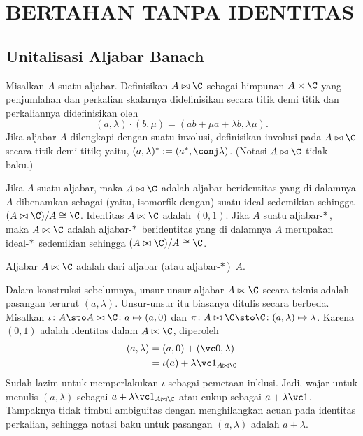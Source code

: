 \chapter{BERTAHAN TANPA IDENTITAS}

\section{Unitalisasi Aljabar Banach}
\begin{defn}\label{00150005} Misalkan $A$ suatu aljabar. Definisikan
$A \bowtie \C$ sebagai himpunan $A \times \C$ yang penjumlahan dan perkalian skalarnya
didefinisikan secara titik demi titik dan perkaliannya didefinisikan oleh
  \[ (a,\lambda)\cdot(b,\mu) = (ab + \mu a + \lambda b, \lambda\mu). \]
Jika aljabar $A$ dilengkapi dengan suatu involusi, definisikan involusi pada $A \bowtie \C$
secara titik demi titik; yaitu, $(a,\lambda)^* := (a^*, \conj\lambda)$. (Notasi $A \bowtie \C$
tidak baku.)
\end{defn}

\begin{prop}\label{0015001} Jika $A$ suatu aljabar, maka $A \bowtie \C$ adalah aljabar
beridentitas yang di dalamnya $A$ dibenamkan sebagai (yaitu, isomorfik dengan) suatu ideal
sedemikian sehingga $(A \bowtie \C)/A \cong \C$. Identitas $A \bowtie \C$ adalah $(0,1)$. Jika
$A$ suatu aljabar-$*\,$, maka $A \bowtie \C$ adalah aljabar-$*\,$ beridentitas yang di dalamnya
$A$ merupakan ideal-$*\,$ sedemikian sehingga $(A \bowtie \C)/A \cong \C$.
\end{prop}

\begin{defn} Aljabar $A \bowtie \C$ adalah
 dari aljabar (atau aljabar-$*\,$)~$A$.
\end{defn}

\begin{notn}\label{00150012} Dalam konstruksi sebelumnya, unsur-unsur aljabar
$A \bowtie \C$ secara teknis adalah pasangan terurut $(a,\lambda)$. Unsur-unsur itu biasanya
ditulis secara berbeda. Misalkan $\iota\colon A \sto A \bowtie \C \colon a \mapsto (a,0)$ dan
$\pi\colon A \bowtie \C \sto \C\colon (a,\lambda) \mapsto \lambda$. Karena $(0,1)$ adalah
identitas dalam $A \bowtie \C$, diperoleh
   \begin{align*} (a,\lambda) &= (a,0) + (\vc 0,\lambda) \\
                              &= \iota(a) + \lambda \vc 1_{A \bowtie \C}
   \end{align*}
Sudah lazim untuk memperlakukan $\iota$ sebagai pemetaan inklusi. Jadi, wajar untuk
menulis $(a,\lambda)$ sebagai $a + \lambda \vc 1_{A \bowtie \C}$ atau cukup sebagai
$a + \lambda \vc 1$. Tampaknya tidak timbul ambiguitas dengan menghilangkan acuan pada
identitas perkalian, sehingga notasi baku untuk pasangan $(a,\lambda)$ adalah $a + \lambda$.
\end{notn}

